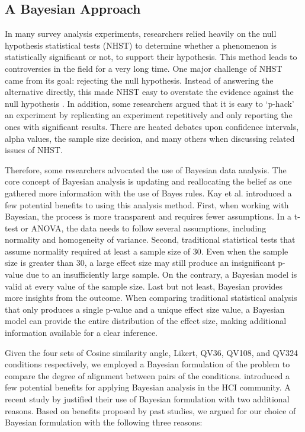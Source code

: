 \subsection{A Bayesian Approach}
\label{A Bayesian Approach}

In many survey analysis experiments, researchers relied heavily on the null hypothesis statistical tests (NHST) to determine whether a phenomenon is statistically significant or not, to support their hypothesis. This method leads to controversies in the field for a very long time. One major challenge of NHST came from its goal: rejecting the null hypothesis. Instead of answering the alternative directly, this made NHST easy to overstate the evidence against the null hypothesis \cite{david2000NHST}. In addition, some researchers \cite{kruschke2010bayesian} argued that it is easy to `p-hack' an experiment by replicating an experiment repetitively and only reporting the ones with significant results. There are heated debates upon confidence intervals, alpha values, the sample size decision, and many others when discussing related issues of NHST.

Therefore, some researchers advocated the use of Bayesian data analysis. The core concept of Bayesian analysis is updating and reallocating the belief as one gathered more information with the use of Bayes rules. Kay et al. \cite{kay2016researcher} introduced a few potential benefits to using this analysis method. First, when working with Bayesian, the process is more transparent and requires fewer assumptions. In a t-test or ANOVA, the data needs to follow several assumptions, including normality and homogeneity of variance. Second, traditional statistical tests that assume normality required at least a sample size of 30. Even when the sample size is greater than 30, a large effect size may still produce an insignificant p-value due to an insufficiently large sample. On the contrary, a Bayesian model is valid at every value of the sample size. Last but not least, Bayesian provides more insights from the outcome. When comparing traditional statistical analysis that only produces a single p-value and a unique effect size value, a Bayesian model can provide the entire distribution of the effect size, making additional information available for a clear inference.

Given the four sets of Cosine similarity angle,
Likert, QV36, QV108, and QV324 conditions respectively,
we employed a Bayesian formulation of the problem 
to compare the degree of alignment between pairs of the conditions. 
\textcite{kay2016researcher} introduced a few potential benefits  
for applying Bayesian analysis in the HCI community. 
A recent study by \textcite{xiao2019should}
justified their use of Bayesian formulation 
with two additional reasons.
Based on benefits proposed by past studies, 
we argued for our choice of Bayesian formulation 
with the following three reasons:

